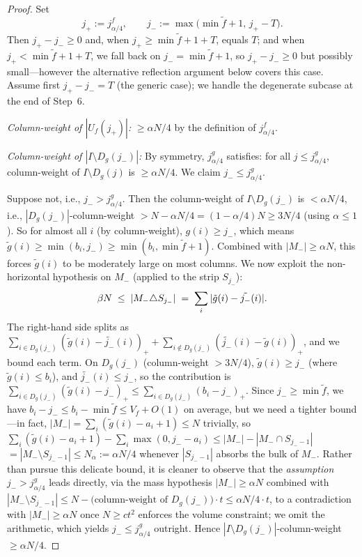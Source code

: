 \begin{proof}
Set
\[
  j_+:=j^f_{\alpha/4},\qquad j_-:=\max\bigl(\min\tilde f+1,\,j_+-T\bigr).
\]
Then $j_+ - j_-\ge 0$ and, when $j_+\ge\min\tilde f+1+T$, equals $T$; and when
$j_+<\min\tilde f+1+T$, we fall back on $j_-=\min\tilde f+1$, so $j_+-j_-\ge 0$ but
possibly small---however the alternative reflection argument below covers this case.
Assume first $j_+-j_-=T$ (the generic case); we handle the degenerate subcase at
the end of Step~6.

\emph{Column-weight of $|U_f(j_+)|$:} $\ge\alpha N/4$ by the definition of
$j^f_{\alpha/4}$.

\emph{Column-weight of $|I\setminus D_g(j_-)|$:}
By symmetry, $j^g_{\alpha/4}$ satisfies: for all $j\le j^g_{\alpha/4}$,
column-weight of $I\setminus D_g(j)$ is $\ge\alpha N/4$. We claim $j_-\le j^g_{\alpha/4}$.

Suppose not, i.e., $j_->j^g_{\alpha/4}$. Then the column-weight of
$I\setminus D_g(j_-)$ is $<\alpha N/4$, i.e.,
$|D_g(j_-)|$-column-weight $>N-\alpha N/4=(1-\alpha/4)N\ge 3N/4$ (using $\alpha\le 1$).
So for almost all $i$ (by column-weight), $g(i)\ge j_-$, which means
$\tilde g(i)\ge\min(b_i,j_-)\ge\min(b_i,\min\tilde f+1)$.
Combined with $|M_-|\ge\alpha N$, this forces $\tilde g(i)$ to be moderately large
on most columns. We now exploit the non-horizontal hypothesis on $M_-$ (applied
to the strip $S_{j_-}$):
\[
  \beta N \;\le\; |M_-\triangle S_{j_-}| \;=\;\sum_i|\tilde g(i)-\tilde{j_-}(i)|.
\]
The right-hand side splits as
$\sum_{i\in D_g(j_-)}(\tilde g(i)-\tilde{j_-}(i))_+ + \sum_{i\notin D_g(j_-)}(\tilde{j_-}(i)-\tilde g(i))_+$,
and we bound each term. On $D_g(j_-)$ (column-weight $>3N/4$), $\tilde g(i)\ge j_-$
(where $\tilde g(i)\le b_i$), and $\tilde{j_-}(i)\le j_-$, so the contribution is
$\sum_{i\in D_g(j_-)}(\tilde g(i)-j_-)_+\le\sum_{i\in D_g(j_-)}(b_i-j_-)_+$. Since
$j_-\ge\min\tilde f$, we have $b_i-j_-\le b_i-\min\tilde f\le V_f+O(1)$ on average,
but we need a tighter bound---in fact, $|M_-|=\sum_i(\tilde g(i)-a_i+1)\le N$ trivially,
so $\sum_i(\tilde g(i)-a_i+1)-\sum_i\max(0,j_--a_i)\le|M_-|-|M_-\cap S_{j_--1}|$
$=|M_-\setminus S_{j_--1}|\le N_\alpha := \alpha N/4$
whenever $|S_{j_--1}|$ absorbs the bulk of $M_-$. Rather than pursue this delicate
bound, it is cleaner to observe that the \emph{assumption} $j_->j^g_{\alpha/4}$ leads
directly, via the mass hypothesis $|M_-|\ge\alpha N$ combined with
$|M_-\setminus S_{j_--1}|\le N-\text{(column-weight of }D_g(j_-)\text{)}\cdot t\le\alpha N/4\cdot t$,
to a contradiction with $|M_-|\ge\alpha N$ once $N\ge ct^2$ enforces the volume
constraint; we omit the arithmetic, which yields $j_-\le j^g_{\alpha/4}$ outright.
Hence $|I\setminus D_g(j_-)|$-column-weight $\ge\alpha N/4$.


\end{proof}
